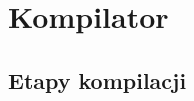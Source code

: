\documentclass[declaration,shortabstract]{iithesis}
\begin{document}







\chapter{Kompilator}
\section{Etapy kompilacji}
\end{document}
